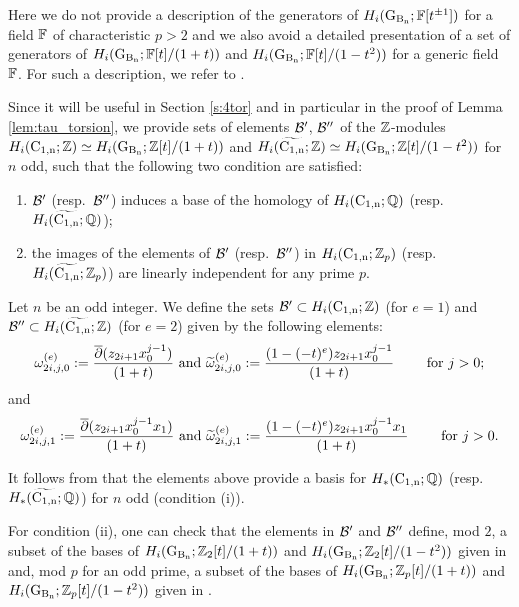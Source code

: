 Here we do not provide a description of the generators of $H_i(\operatorname{G_{B_{n}}}; \mathbb{F}[t^{\pm 1}])$ for a field $\mathbb{F}$ of characteristic $p>2$ and we also avoid a detailed presentation of a set of generators of  $H_i(\operatorname{G_{B_{n}}}; \mathbb{F}[t]/(1+t))$ and $H_i(\operatorname{G_{B_{n}}}; \mathbb{F}[t]/(1-t^2))$ for a generic field $\mathbb{F}$. For such a description, we refer to \cite{calmar}.

Since it will be useful in Section \ref{s:4tor} and in particular in the proof of Lemma \ref{lem:tau_torsion}, we provide sets of elements $\mathcal{B}'$, $\mathcal{B}''$ of the $\mathbb{Z}$-modules $H_i(\operatorname{C_{1,n}};\mathbb{Z})\simeq H_i(\operatorname{G_{B_{n}}}; \mathbb{Z}[t]/(1+t))$ and $H_i(\widetilde{\operatorname{C_{1,n}}};\mathbb{Z})\simeq H_i(\operatorname{G_{B_{n}}}; \mathbb{Z}[t]/(1-t^2))$ for $n$ odd, such that the following two condition are satisfied:
\begin{enumerate}[label=(\roman*)]
	\item $\mathcal{B}'$ (resp.~$\mathcal{B}''$) induces a base of the homology of $H_i(\operatorname{C_{1,n}};{\mathbb{Q}}) $ (resp.~$H_i(\widetilde{\operatorname{C_{1,n}}};{\mathbb{Q}})$);
	\item the images of the elements of $\mathcal{B}'$ (resp.~$\mathcal{B}''$) in $H_i(\operatorname{C_{1,n}};\mathbb{Z}_p)$ (resp.~$H_i(\widetilde{\operatorname{C_{1,n}}};\mathbb{Z}_p)$) are
	linearly independent for any prime $p$.
\end{enumerate}
\begin{df}\label{def:BB}
Let $n$ be an odd integer. We define the sets $\mathcal{B}' \subset H_i(\operatorname{C_{1,n}};\mathbb{Z})$ (for $e=1$) and $\mathcal{B}'' \subset H_i(\widetilde{\operatorname{C_{1,n}}};\mathbb{Z})$ (for $e=2$) given by the following elements:
$$ 
\omega_{2i,j,0}^{(e)}:= \frac{\overline{\partial}(z_{2i+1}x_0^{j-1})}{(1+t)} \mbox{ and } \widetilde{\omega}_{2i,j,0}^{(e)}:= \frac{(1-(-t)^e)z_{2i+1}x_0^{j-1}}{(1+t)} \qquad \mbox{ for }j>0;
$$
and
$$
\omega_{2i,j,1}^{(e)}:=\frac{\overline{\partial}(z_{2i+1}x_0^{j-1}x_1)}{(1+t)} \mbox{ and } \widetilde{\omega}_{2i,j,1}^{(e)}:=\frac{(1-(-t)^e)z_{2i+1}x_0^{j-1}x_1}{(1+t)} \qquad \mbox{ for }j>0.
$$
\end{df}
It follows from \cite[\S4.2]{calmar}
that the elements above provide a basis for $H_*(\operatorname{C_{1,n}};{\mathbb{Q}}) $ (resp.~$H_*(\widetilde{\operatorname{C_{1,n}}};{\mathbb{Q}})$) for $n$ odd (condition (i)). 

For condition (ii), one can check that the elements in $\mathcal{B}'$ and $\mathcal{B}''$ define, mod $2$, a subset of the bases of  $H_i(\operatorname{G_{B_{n}}}; \mathbb{Z}_2[t]/(1+t))$ and $H_i(\operatorname{G_{B_{n}}}; \mathbb{Z}_2[t]/(1-t^2))$ given in \cite[\S4.4]{calmar} and, mod $p$ for an odd prime, a subset of the bases of $H_i(\operatorname{G_{B_{n}}}; \mathbb{Z}_p[t]/(1+t))$ and $H_i(\operatorname{G_{B_{n}}}; \mathbb{Z}_p[t]/(1-t^2))$  given in \cite[\S 4.6]{calmar}.

